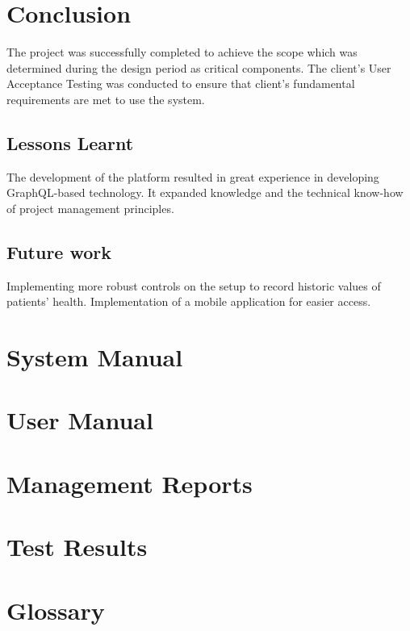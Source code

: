 \documentclass[12pt,a4paper]{report}
\begin{document}


\chapter{Conclusion}

The project was successfully completed to achieve the scope which was determined during the design period as critical components. The client’s User Acceptance Testing was conducted to ensure that client's fundamental requirements are met to use the system.

\section{Lessons Learnt}

The development of the platform resulted in great experience in developing GraphQL-based technology. It expanded knowledge and the technical know-how of project management principles. 

\section{Future work}

Implementing more robust controls on the setup to record historic values of patients' health. 
Implementation of a mobile application for easier access. 



\appendix
{}
\chapter{System Manual}

\chapter{User Manual}
\chapter{Management Reports}
\chapter{Test Results}


\chapter*{Glossary}
\printglossary[type=\acronymtype]

\printbibliography[nottype=book,heading=bibliography,title={References}]
\end{document}
